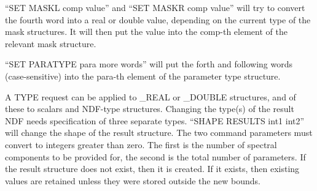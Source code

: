 {{{         \sstitem
         ``SET MASKL comp value'' and ``SET MASKR comp value'' will try
            to convert the fourth word into a real or double value,
            depending on the current type of the mask structures. It
            will then put the value into the comp-th element of the
            relevant mask structure.

         \sstitem
         ``SET PARATYPE para more words'' will put the forth and
            following words (case-sensitive) into the para-th element
            of the parameter type structure.

      }
      A TYPE request can be applied to \_REAL or \_DOUBLE structures,
      and of these to scalars and NDF-type structures. Changing the
      type(s) of the result NDF needs specification of three separate
      types.
      ``SHAPE RESULTS int1 int2'' will change the shape of the result
      structure. The two command parameters must convert to integers
      greater than zero. The first is the number of spectral
      components to be provided for, the second is the total number
      of parameters. If the result structure does not exist, then it
      is created. If it exists, then existing values are retained
      unless they were stored outside the new bounds.
   }
}
\goodbreak
